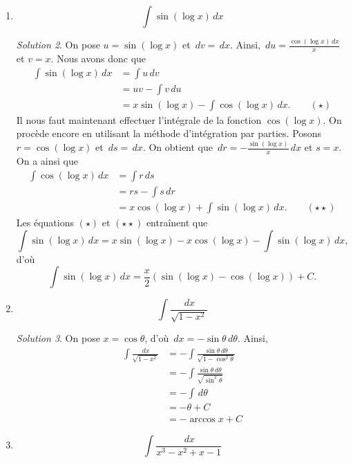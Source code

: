 \documentclass[
  12pt,
  letterpaper,
]{book}
\theoremstyle{remark}
\newtheorem*{solution}{Solution}
\begin{document}
\begin{enumerate}
\begin{solution}
  \end{solution}
\item
  \[\int\sin(\log x)\,dx\]

  \begin{solution}

  On pose \(u=\sin(\log x)\) et \(\,dv=\,dx\). Ainsi,
  \(\,du=\frac{\cos(\log x)\,dx}{x}\) et \(v=x\). Nous avons donc que
  \begin{align}
  \int\sin(\log x)\,dx&=\int u\,dv \\
  &=uv-\int v\,du \\
  &=x\sin(\log x)-\int \cos(\log x)\,dx. \qquad(\star)
  \end{align} Il nous faut maintenant effectuer l'intégrale de la
  fonction \(\cos(\log x)\). On procède encore en utilisant la méthode
  d'intégration par parties. Posons \(r=\cos(\log x)\) et \(\,ds=\,dx\).
  On obtient que \(\,dr=-\frac{\sin(\log x)}{x}\,dx\) et \(s=x\). On a
  ainsi que \begin{align}
  \int \cos(\log x)\,dx&=\int r\,ds \\
  &=rs-\int s\,dr \\
  &=x\cos(\log x)+\int \sin(\log x)\,dx. \qquad(\star\star)
  \end{align} Les équations \((\star)\) et \((\star\star)\) entraînent
  que
  \[\int\sin(\log x)\,dx=x\sin(\log x)-x\cos(\log x )-\int \sin(\log x)\,dx,\]
  d'où
  \[\int\sin(\log x)\,dx=\frac{x}{2}\left(\sin(\log x)-\cos(\log x)\right)+C.\]

  \end{solution}
\item
  \[\int\frac{\,dx}{\sqrt{1-x^2}}\]

  \begin{solution}

  On pose \(x=\cos\theta\), d'où \(\,dx=-\sin\theta \,d\theta\). Ainsi,
  \begin{align}
  \int\frac{\,dx}{\sqrt{1-x^2}}&=-\int\frac{\sin\theta \,d\theta}{\sqrt{1-\cos^2\theta}} \\
  &=-\int\frac{\sin\theta \,d\theta}{\sqrt{\sin^2\theta}} \\
  &=-\int \,d\theta \\
  &=-\theta +C \\
  &=-\arccos x +C
  \end{align}

  \end{solution}
\item
  \[\int\frac{\,dx}{x^3-x^2+x-1}\]


\end{enumerate}
\end{document}
